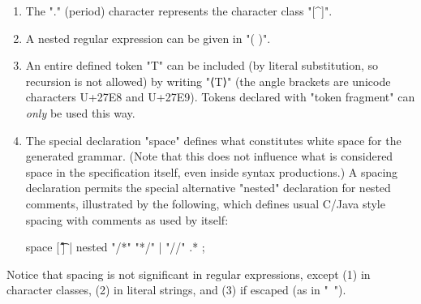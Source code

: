 \documentclass[12pt]{article} %
\begin{document}
\begin{manual}
\begin{enumerate}
  \item The "." (period) character represents the character class "[^\n]".

  \item A nested regular expression can be given in "( )".

  \item An entire defined token "T" can be included (by literal substitution, so recursion is not
    allowed) by writing "⟨T⟩" (the angle brackets are unicode characters U+27E8 and U+27E9). Tokens
    declared with "token fragment" can \emph{only} be used this way.

  \item The special declaration "space" defines what constitutes white space for the generated
    grammar. (Note that this does not influence what is considered space in the specification
    itself, even inside syntax productions.) A spacing declaration permits the special alternative
    "nested" declaration for nested comments, illustrated by the following, which defines usual
    C/Java style spacing with comments as used by \HAX itself:
\begin{hacs}[xleftmargin=\parindent]
space [ \t\f\r\n] | nested "/*" "*/" | "//" .* ;
\end{hacs}

  \end{enumerate}
  Notice that spacing is not significant in regular expressions, except (1) in character classes,
  (2) in literal strings, and (3) if escaped (as in "\ ").
\end{manual}
\end{document}
